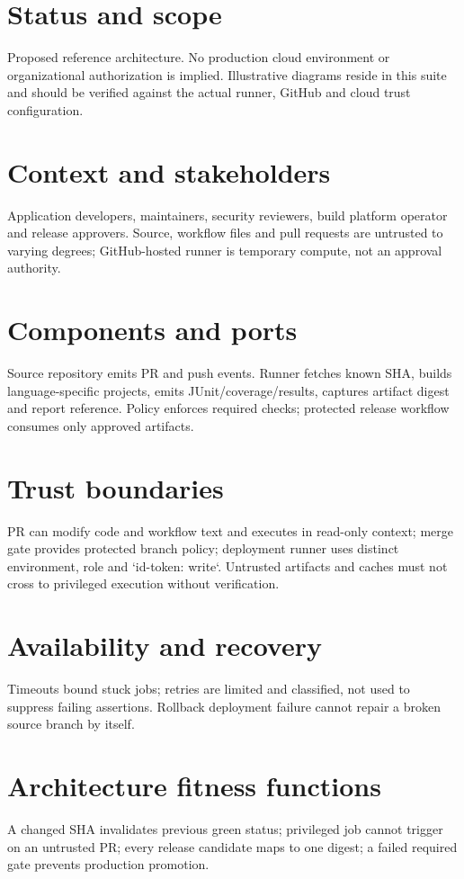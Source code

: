 \documentclass[11pt,letterpaper]{article}
\begin{document}
\makedoctitle
\makedocsummary
\tableofcontents
\clearpage
\section{Status and scope}
Proposed reference architecture. No production cloud environment or organizational authorization is implied. Illustrative diagrams reside in this suite and should be verified against the actual runner, GitHub and cloud trust configuration.

\section{Context and stakeholders}
Application developers, maintainers, security reviewers, build platform operator and release approvers. Source, workflow files and pull requests are untrusted to varying degrees; GitHub-hosted runner is temporary compute, not an approval authority.

\section{Components and ports}
Source repository emits PR and push events. Runner fetches known SHA, builds language-specific projects, emits JUnit/coverage/results, captures artifact digest and report reference. Policy enforces required checks; protected release workflow consumes only approved artifacts.

\section{Trust boundaries}
PR can modify code and workflow text and executes in read-only context; merge gate provides protected branch policy; deployment runner uses distinct environment, role and `id-token: write`. Untrusted artifacts and caches must not cross to privileged execution without verification.

\section{Availability and recovery}
Timeouts bound stuck jobs; retries are limited and classified, not used to suppress failing assertions. Rollback deployment failure cannot repair a broken source branch by itself.

\section{Architecture fitness functions}
A changed SHA invalidates previous green status; privileged job cannot trigger on an untrusted PR; every release candidate maps to one digest; a failed required gate prevents production promotion.
\end{document}
